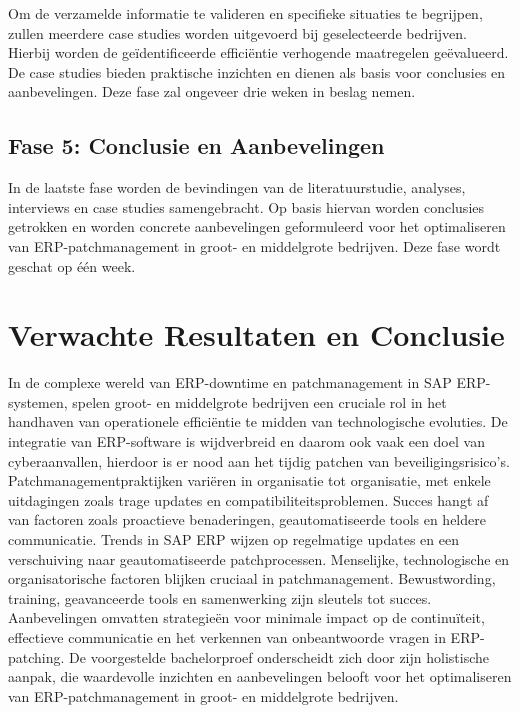 Om de verzamelde informatie te valideren en specifieke situaties te begrijpen, zullen meerdere case studies worden uitgevoerd bij geselecteerde bedrijven. Hierbij worden de geïdentificeerde efficiëntie verhogende maatregelen geëvalueerd. De case studies bieden praktische inzichten en dienen als basis voor conclusies en aanbevelingen. Deze fase zal ongeveer drie weken in beslag nemen.

\subsection{Fase 5: Conclusie en Aanbevelingen}

In de laatste fase worden de bevindingen van de literatuurstudie, analyses, interviews en case studies samengebracht. Op basis hiervan worden conclusies getrokken en worden concrete aanbevelingen geformuleerd voor het optimaliseren van ERP-patchmanagement in groot- en middelgrote bedrijven. Deze fase wordt geschat op één week.

\section{Verwachte Resultaten en Conclusie}%
\label{sec:verwachte-resultaten}

In de complexe wereld van ERP-downtime en patchmanagement in SAP ERP-systemen, spelen groot- en middelgrote bedrijven een cruciale rol in het handhaven van operationele efficiëntie te midden van technologische evoluties. De integratie van ERP-software is wijdverbreid en daarom ook vaak een doel van cyberaanvallen, hierdoor is er nood aan het tijdig patchen van beveiligingsrisico’s. 
Patchmanagementpraktijken variëren in organisatie tot organisatie, met enkele uitdagingen zoals trage updates en compatibiliteitsproblemen. Succes hangt af van factoren zoals proactieve benaderingen, geautomatiseerde tools en heldere communicatie.
Trends in SAP ERP wijzen op regelmatige updates en een verschuiving naar geautomatiseerde patchprocessen. Menselijke, technologische en organisatorische factoren blijken cruciaal in patchmanagement. Bewustwording, training, geavanceerde tools en samenwerking zijn sleutels tot succes. Aanbevelingen omvatten strategieën voor minimale impact op de continuïteit, effectieve communicatie en het verkennen van onbeantwoorde vragen in ERP-patching.
De voorgestelde bachelorproef onderscheidt zich door zijn holistische aanpak, die waardevolle inzichten en aanbevelingen belooft voor het optimaliseren van ERP-patchmanagement in groot- en middelgrote bedrijven.
